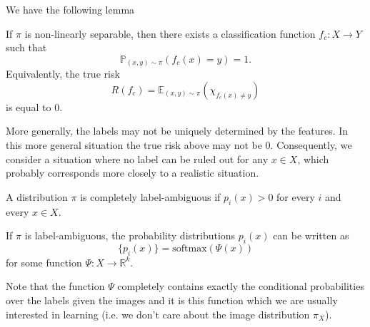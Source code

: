 We have the following lemma
\begin{lemma}
 If $\pi$ is non-linearly separable, then there exists a classification function $f_c:X\rightarrow Y$ such that
 \begin{equation}
  \mathbb{P}_{(x,y)\sim \pi}(f_c(x) = y) = 1.
 \end{equation}
 Equivalently, the true risk
 \begin{equation}
  R(f_c) = \mathbb{E}_{(x,y)\sim\pi}(\chi_{f_c(x) \neq y})
 \end{equation}
 is equal to $0$.

\end{lemma}

More generally, the labels may not be uniquely determined by the features. In this more general situation the true risk above may not be $0$. Consequently, we consider a situation where no label can be ruled out for any $x\in X$, which probably corresponds more closely to a realistic situation.

\begin{definition}
 A distribution $\pi$ is completely label-ambiguous if
 $p_i(x) > 0$ for every $i$ and every $x\in X$.
\end{definition}

\begin{lemma}
 If $\pi$ is label-ambiguous, the probability distributions $p_i(x)$ can be written as
 \begin{equation}
  \{p_i(x)\} = \text{softmax}(\Psi(x))
 \end{equation}
 for some function $\Psi:X\rightarrow \mathbb{R}^k$.
\end{lemma}

Note that the function $\Psi$ completely contains exactly the conditional probabilities over the labels given the images and it is this function which we are usually interested in learning (i.e. we don't care about the image distribution $\pi_X$).
